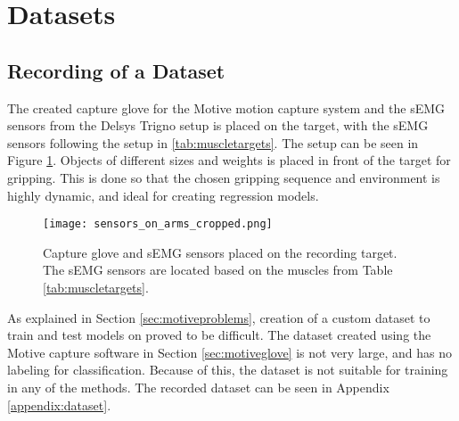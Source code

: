 \documentclass[../main.tex]{subfiles}
\begin{document}




\section{Datasets}

\subsection{Recording of a Dataset}

The created capture glove for the Motive motion capture system and the sEMG sensors from the Delsys Trigno setup is placed on the target, with the sEMG sensors following the setup in \ref{tab:muscletargets}.
The setup can be seen in Figure \ref{fig:musclesensorsonarm}.
Objects of different sizes and weights is placed in front of the target for gripping. 
This is done so that the chosen gripping sequence and environment is highly dynamic, and ideal for creating regression models.

\begin{figure}[H]
\begin{center}
\texttt{[image: sensors\_on\_arms\_cropped.png]}
\caption{Capture glove and sEMG sensors placed on the recording target. The sEMG sensors are located based on the muscles from Table \ref{tab:muscletargets}.}
\label{fig:musclesensorsonarm}
\end{center}
\end{figure}

As explained in Section \ref{sec:motiveproblems}, creation of a custom dataset to train and test models on proved to be difficult.
The dataset created using the Motive capture software in Section \ref{sec:motiveglove} is not very large, and has no labeling for classification.
Because of this, the dataset is not suitable for training in any of the methods.
The recorded dataset can be seen in Appendix \ref{appendix:dataset}. 
\end{document}
